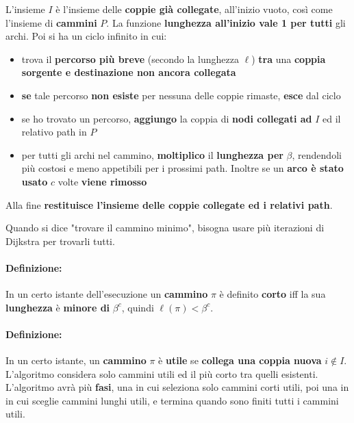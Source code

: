 \documentclass[11pt]{article}
\begin{document}
	L'insieme $I$ è l'insieme delle \textbf{coppie già collegate}, all'inizio vuoto, così come l'insieme di \textbf{cammini} $P$. La funzione \textbf{lunghezza all'inizio vale 1 per tutti} gli archi. Poi si ha un ciclo infinito in cui: 
	\begin{itemize}
		\item trova il \textbf{percorso più breve} (secondo la lunghezza $\ell$) \textbf{tra} una \textbf{coppia sorgente e destinazione non ancora collegata}
		\item \textbf{se} tale percorso \textbf{non esiste} per nessuna delle coppie rimaste, \textbf{esce} dal ciclo
		\item se ho trovato un percorso, \textbf{aggiungo} la coppia di \textbf{nodi collegati ad} $I$ ed il relativo path in $P$
		\item per tutti gli archi nel cammino, \textbf{moltiplico} il \textbf{lunghezza per} $\beta$, rendendoli più costosi e meno appetibili per i prossimi path. Inoltre se un \textbf{arco è stato usato} $c$ volte \textbf{viene rimosso}
	\end{itemize}
	Alla fine \textbf{restituisce l'insieme delle coppie collegate ed i relativi path}.\\
	
	\newpage
	
	Quando si dice "trovare il cammino minimo", bisogna usare più iterazioni di Dijkstra per trovarli tutti.\\
	
	\paragraph{Definizione:} In un certo istante dell'esecuzione un \textbf{cammino} $\pi$ è definito \textbf{corto} iff la sua \textbf{lunghezza} è \textbf{minore di} $\beta^c$, quindi $\ell(\pi) < \beta^c$. \\
	
	\paragraph{Definizione:} In un certo istante, un \textbf{cammino} $\pi$ è \textbf{utile} se \textbf{collega una coppia nuova} $i \notin I$. L'algoritmo considera solo cammini utili ed il più corto tra quelli esistenti.\\
	
	L'algoritmo avrà più \textbf{fasi}, una in cui seleziona solo cammini corti utili, poi una in in cui sceglie cammini lunghi utili, e termina quando sono finiti tutti i cammini utili.\\
	
\end{document}
